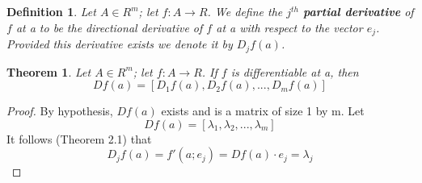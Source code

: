 \documentclass[12pt, letterpaper]{article}
\newtheorem{definition}{Definition}[section]
\newtheorem{theorem}{Theorem}[section]
\begin{document}
		\begin{definition}
			Let $A \in R^m$; let $f: A \to R$. We define the $j^{th}$ \textbf{partial derivative} of $f$ at a to be the directional derivative of $f$ at a with respect to the vector $e_{j}$. Provided this derivative exists we denote it by $D_{j}f(a)$. \newline
		\end{definition}
		
		
		
		\begin{theorem}
			Let $A \in R^m$; let $f: A \to R$. If $f$ is differentiable at a, then
				\[Df(a) = \left[D_{1}f(a), D_{2}f(a), ... , D_{m}f(a)\right]\]
		\end{theorem}
		\begin{proof}
		By hypothesis, $Df(a)$ exists and is a matrix of size 1 by m. Let
			\[Df(a) = \left[\lambda_{1}, \lambda_{2}, ..., \lambda_{m}\right]\]
		It follows (Theorem 2.1) that
			\[D_{j}f(a) = f'(a;e_{j}) = Df(a)\cdot e_{j} = \lambda_{j}\]
		\end{proof}
		
		
		
		
		
		
		
		
		
		
		
		
		
		
		
		
		
		
		
		
		
		
		
		
		
		
		
		
		
		
		
		
\end{document}
